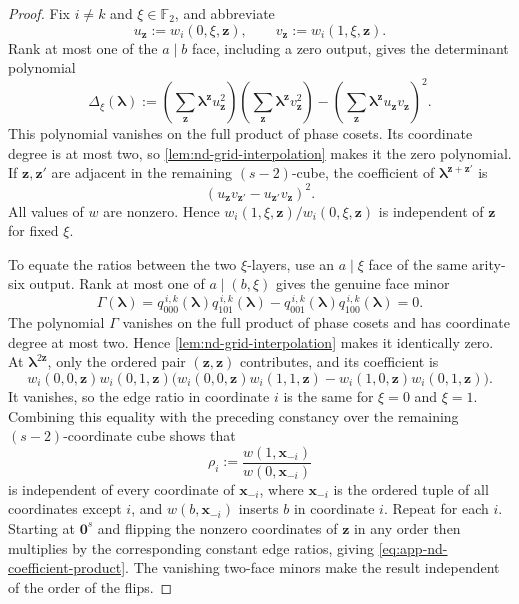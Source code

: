 \documentclass[11pt,letterpaper,onecolumn]{article}
\theoremstyle{plain}
\theoremstyle{definition}
\theoremstyle{remark}
\newcommand{\Ftwo}{\mathbb F_2}
\newcommand{\zero}{\mathbf 0}
\begin{document}
\begin{proof}
Fix \(i\ne k\) and \(\xi\in\Ftwo\), and abbreviate
\[
 u_{\mathbf z}:=w_i(0,\xi,{\mathbf z}),\qquad v_{\mathbf z}:=w_i(1,\xi,{\mathbf z}).
\]
Rank at most one of the \(a\mid b\) face, including a zero output, gives the
determinant polynomial
\begin{equation*}
  \Delta_\xi({\boldsymbol\lambda})
  :=
  \left(\sum_{\mathbf z}{\boldsymbol\lambda}^{\mathbf z}u_{\mathbf z}^2\right)
  \left(\sum_{\mathbf z}{\boldsymbol\lambda}^{\mathbf z}v_{\mathbf z}^2\right)
  -
  \left(\sum_{\mathbf z}{\boldsymbol\lambda}^{\mathbf z}u_{\mathbf z}v_{\mathbf z}\right)^2.
\end{equation*}
This polynomial vanishes on the full product of phase cosets.  Its coordinate
degree is at most two, so \cref{lem:nd-grid-interpolation} makes it the zero
polynomial.  If \({\mathbf z},{\mathbf z}'\) are adjacent in the remaining \((s-2)\)-cube, the
coefficient of \({\boldsymbol\lambda}^{{\mathbf z}+{\mathbf z}'}\) is
\begin{equation*}
  (u_{\mathbf z}v_{{\mathbf z}'}-u_{{\mathbf z}'}v_{\mathbf z})^2.
\end{equation*}
All values of \(w\) are nonzero. Hence
\(w_i(1,\xi,{\mathbf z})/w_i(0,\xi,{\mathbf z})\) is independent of \({\mathbf z}\) for fixed \(\xi\).

To equate the ratios between the two \(\xi\)-layers, use an
\(a\mid\xi\) face of the same arity-six output.  Rank at most one of
\(a\mid(b,\xi)\) gives the genuine face minor
\begin{equation*}
  \Gamma({\boldsymbol\lambda})
  =q^{\,i,k}_{000}({\boldsymbol\lambda})q^{\,i,k}_{101}({\boldsymbol\lambda})
   -q^{\,i,k}_{001}({\boldsymbol\lambda})q^{\,i,k}_{100}({\boldsymbol\lambda})=0.
\end{equation*}
The polynomial \(\Gamma\) vanishes on the full product of phase cosets and
has coordinate degree at most two.  Hence
\cref{lem:nd-grid-interpolation} makes it identically zero.
At \({\boldsymbol\lambda}^{2{\mathbf z}}\), only the ordered pair \(({\mathbf z},{\mathbf z})\) contributes, and its
coefficient is
\begin{equation*}
  w_i(0,0,{\mathbf z})w_i(0,1,{\mathbf z})
  \bigl(w_i(0,0,{\mathbf z})w_i(1,1,{\mathbf z})
        -w_i(1,0,{\mathbf z})w_i(0,1,{\mathbf z})\bigr).
\end{equation*}
It vanishes, so the edge ratio in coordinate \(i\) is the same for
\(\xi=0\) and \(\xi=1\).  Combining this equality with the preceding
constancy over the remaining \((s-2)\)-coordinate cube shows that
\[
 \rho_i:=\frac{w(1,{\mathbf x}_{-i})}{w(0,{\mathbf x}_{-i})}
\]
is independent of every coordinate of \({\mathbf x}_{-i}\), where \({\mathbf x}_{-i}\) is the
ordered tuple of all coordinates except \(i\), and \(w(b,{\mathbf x}_{-i})\) inserts
\(b\) in coordinate \(i\).  Repeat for each \(i\).
Starting at \(\zero^s\) and flipping the nonzero coordinates of \({\mathbf z}\) in any order
then multiplies by the corresponding constant edge ratios, giving
\cref{eq:app-nd-coefficient-product}.  The vanishing two-face minors make
the result independent of the order of the flips.
\end{proof}
\end{document}
